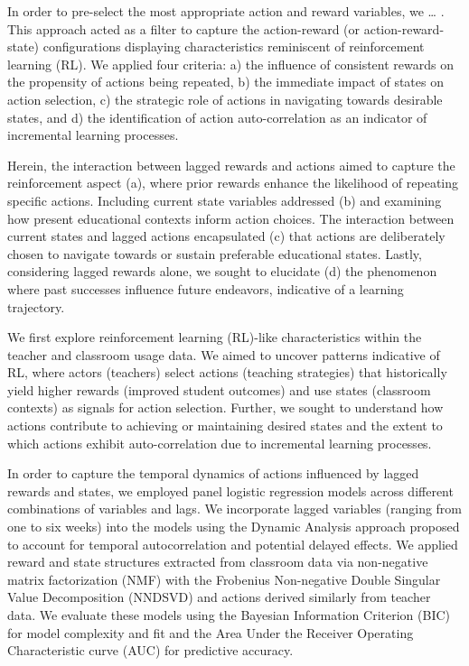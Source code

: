 \documentclass[
  number,
  preprint,
  3p,
  onecolumn]{elsarticle}
\begin{document}
In order to pre-select the most appropriate action and reward variables,
we \ldots{} \citep{lau2005}. This approach acted as a filter to capture
the action-reward (or action-reward-state) configurations displaying
characteristics reminiscent of reinforcement learning (RL). We applied
four criteria: a) the influence of consistent rewards on the propensity
of actions being repeated, b) the immediate impact of states on action
selection, c) the strategic role of actions in navigating towards
desirable states, and d) the identification of action auto-correlation
as an indicator of incremental learning processes.

Herein, the interaction between lagged rewards and actions aimed to
capture the reinforcement aspect (a), where prior rewards enhance the
likelihood of repeating specific actions. Including current state
variables addressed (b) and examining how present educational contexts
inform action choices. The interaction between current states and lagged
actions encapsulated (c) that actions are deliberately chosen to
navigate towards or sustain preferable educational states. Lastly,
considering lagged rewards alone, we sought to elucidate (d) the
phenomenon where past successes influence future endeavors, indicative
of a learning trajectory.

We first explore reinforcement learning (RL)-like characteristics within
the teacher and classroom usage data. We aimed to uncover patterns
indicative of RL, where actors (teachers) select actions (teaching
strategies) that historically yield higher rewards (improved student
outcomes) and use states (classroom contexts) as signals for action
selection. Further, we sought to understand how actions contribute to
achieving or maintaining desired states and the extent to which actions
exhibit auto-correlation due to incremental learning processes.

In order to capture the temporal dynamics of actions influenced by
lagged rewards and states, we employed panel logistic regression models
across different combinations of variables and lags. We incorporate
lagged variables (ranging from one to six weeks) into the models using
the Dynamic Analysis approach proposed to account for temporal
autocorrelation and potential delayed effects. We applied reward and
state structures extracted from classroom data via non-negative matrix
factorization (NMF) with the Frobenius Non-negative Double Singular
Value Decomposition (NNDSVD) and actions derived similarly from teacher
data. We evaluate these models using the Bayesian Information Criterion
(BIC) for model complexity and fit and the Area Under the Receiver
Operating Characteristic curve (AUC) for predictive accuracy.
\end{document}
